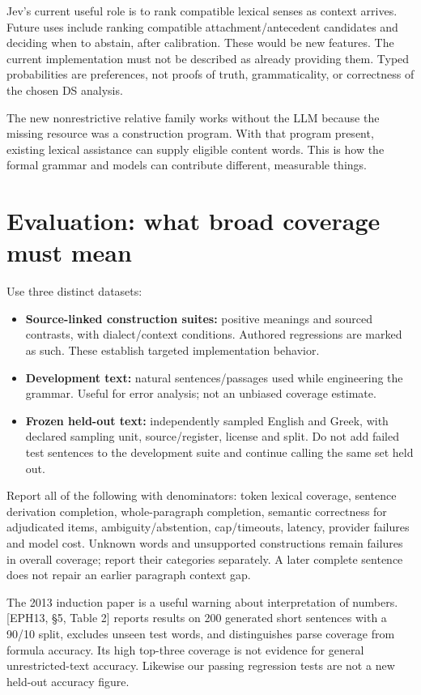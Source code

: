 \documentclass[11pt,a4paper]{article}
\providecommand{\tightlist}{\setlength{\itemsep}{2pt}\setlength{\parskip}{0pt}}
\begin{document}
Jev's current useful role is to rank compatible lexical senses as
context arrives. Future uses include ranking compatible
attachment/antecedent candidates and deciding when to abstain, after
calibration. These would be new features. The current implementation
must not be described as already providing them. Typed probabilities are
preferences, not proofs of truth, grammaticality, or correctness of the
chosen DS analysis.

The new nonrestrictive relative family works without the LLM because the
missing resource was a construction program. With that program present,
existing lexical assistance can supply eligible content words. This is
how the formal grammar and models can contribute different, measurable
things.

\section{Evaluation: what broad coverage must
mean}\label{evaluation-what-broad-coverage-must-mean}

Use three distinct datasets:

\begin{itemize}
\tightlist
\item
  \textbf{Source-linked construction suites:} positive meanings and
  sourced contrasts, with dialect/context conditions. Authored
  regressions are marked as such. These establish targeted
  implementation behavior.
\item
  \textbf{Development text:} natural sentences/passages used while
  engineering the grammar. Useful for error analysis; not an unbiased
  coverage estimate.
\item
  \textbf{Frozen held-out text:} independently sampled English and
  Greek, with declared sampling unit, source/register, license and
  split. Do not add failed test sentences to the development suite and
  continue calling the same set held out.
\end{itemize}

Report all of the following with denominators: token lexical coverage,
sentence derivation completion, whole-paragraph completion, semantic
correctness for adjudicated items, ambiguity/abstention, cap/timeouts,
latency, provider failures and model cost. Unknown words and unsupported
constructions remain failures in overall coverage; report their
categories separately. A later complete sentence does not repair an
earlier paragraph context gap.

The 2013 induction paper is a useful warning about interpretation of
numbers. {[}EPH13, §5, Table 2{]} reports results on 200 generated short
sentences with a 90/10 split, excludes unseen test words, and
distinguishes parse coverage from formula accuracy. Its high top-three
coverage is not evidence for general unrestricted-text accuracy.
Likewise our passing regression tests are not a new held-out accuracy
figure.
\end{document}
